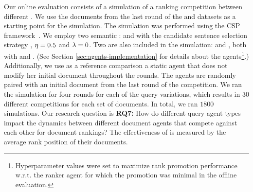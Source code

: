
Our online evaluation consists of a simulation of a ranking competition between different \botagents. 
We use the documents from the last round of the \MultiB and \MultiD datasets as a starting point for the simulation. 
The simulation was performed using the CSP framework~\cite{Lemss}. 
We employ two semantic \botagents: \efive and \contriever with the candidate sentence selection strategy \textit{\better}, 
$\eta=0.5$ and $\lambda=0$.
Two \llm \botagents are also included in the simulation: \gemma and \llama, both with \feedbackPair \xspace and \withoutnocopy. (See Section \ref{sec:agents-implementation} for details about the 
agents\footnote{Hyperparameter values were set to maximize rank promotion performance w.r.t. the ranker agent for which the promotion was minimal in the offline evaluation.}.)
Additionally, we use as a reference comparison a static agent that does not modify her initial document throughout the rounds. 
The agents are randomly paired with an initial document from the last round of the competition.
We ran the simulation for four rounds for each of the query variations, which results in $30$ 
different 
competitions for each set of documents.  
In total, we ran
$1800$ simulations. 
Our research question is \textbf{RQ7:} How do different query agent types impact the dynamics between different document agents that compete against each other for document rankings? 
The effectiveness of \botagents is measured by the average rank position of their documents. 